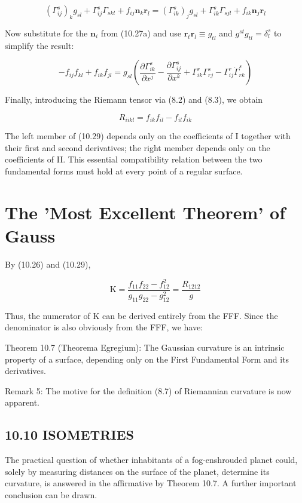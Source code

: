 \documentclass[10pt]{article}
\begin{document}
$$
\left(\Gamma_{i j}^{s}\right)_{k} g_{s l}+\Gamma_{i j}^{s} \Gamma_{s k l}+f_{i j} \mathbf{n}_{k} \mathbf{r}_{l}=\left(\Gamma_{i k}^{s}\right)_{j} g_{s l}+\Gamma_{i k}^{s} \Gamma_{s j l}+f_{i k} \mathbf{n}_{j} \mathbf{r}_{l}
$$

Now substitute for the $\mathbf{n}_{i}$ from (10.27a) and use $\mathbf{r}_{t} \mathbf{r}_{l} \equiv g_{t l}$ and $g^{s t} g_{t l}=\delta_{l}^{s}$ to simplify the result:

$$
-f_{i j} f_{k l}+f_{i k} f_{j l}=g_{s l}\left(\frac{\partial \Gamma_{i k}^{s}}{\partial x^{j}}-\frac{\partial \Gamma_{i j}^{s}}{\partial x^{k}}+\Gamma_{i k}^{r} \Gamma_{r j}^{s}-\Gamma_{i j}^{r} \dot{\Gamma}_{r k}^{s}\right)
$$

Finally, introducing the Riemann tensor via (8.2) and (8.3), we obtain


\begin{equation*}
R_{i i k l}=f_{i k} f_{i l}-f_{i l} f_{i k} \tag{10.29}
\end{equation*}


The left member of (10.29) depends only on the coefficients of I together with their first and second derivatives; the right member depends only on the coefficients of II. This essential compatibility relation between the two fundamental forms must hold at every point of a regular surface.

\section*{The 'Most Excellent Theorem' of Gauss}
By (10.26) and (10.29),


\begin{equation*}
\mathrm{K}=\frac{f_{11} f_{22}-f_{12}^{2}}{g_{11} g_{22}-g_{12}^{2}}=\frac{R_{1212}}{g} \tag{10.30}
\end{equation*}


Thus, the numerator of $\mathrm{K}$ can be derived entirely from the FFF. Since the denominator is also obviously from the FFF, we have:

Theorem 10.7 (Theorema Egregium): The Gaussian curvature is an intrinsic property of a surface, depending only on the First Fundamental Form and its derivatives.

Remark 5: The motive for the definition (8.7) of Riemannian curvature is now apparent.

\subsection*{10.10 ISOMETRIES}
The practical question of whether inhabitants of a fog-enshrouded planet could, solely by measuring distances on the surface of the planet, determine its curvature, is answered in the affirmative by Theorem 10.7. A further important conclusion can be drawn.
\end{document}
